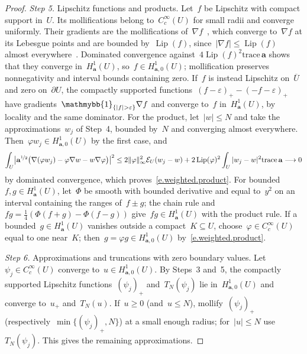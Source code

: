 \documentclass[11pt,letterpaper]{article}
\numberwithin{equation}{section}
\theoremstyle{definition}
\renewcommand{\a}{\mathbf{a}}
\newcommand{\eps}{\varepsilon}
\newcommand{\nf}{\nicefrac}
\newcommand*{\tr}{\mathrm{trace\,}}
\DeclarePairedDelimiter{\norm}{\lVert}{\rVert}
\renewcommand{\subset}{\subseteq}
\newcommand{\indc}{{\mathmybb{1}}}
\newcommand{\Ener}{\mathcal E}
\newcommand{\Hzero}[1]{H^1_{#1,0}}
\begin{document}
\begin{proof}
\smallskip

\emph{Step 5.} Lipschitz functions and products. Let~$f$ be Lipschitz with compact support in~$U$. Its mollifications belong to~$C^\infty_c(U)$ for small radii and converge uniformly. Their gradients are the mollifications of~$\nabla f$~\cite[Lemma 1.18 and Theorem 1.19]{Kinnunen.sobolev}, which converge to~$\nabla f$ at its Lebesgue points and are bounded by~$\operatorname{Lip}(f)$, since~$|\nabla f|\leq\operatorname{Lip}(f)$ almost everywhere~\cite[Theorem 3.31]{Kinnunen.sobolev}. Dominated convergence against~$4\operatorname{Lip}(f)^2\tr\a$ shows that they converge in~$H^1_\a(U)$, so~$f\in\Hzero{\a}(U)$; mollification preserves nonnegativity and interval bounds containing zero. If~$f$ is instead Lipschitz on~$\overline U$ and zero on~$\partial U$, the compactly supported functions~$(f-\eps)_+-(-f-\eps)_+$ have gradients~$\indc_{\{|f|>\eps\}}\nabla f$ and converge to~$f$ in~$H^1_\a(U)$, by locality and the same dominator. For the product, let~$|w|\leq N$ and take the approximations~$w_j$ of Step~4, bounded by~$N$ and converging almost everywhere. Then~$\varphi w_j\in\Hzero{\a}(U)$ by the first case, and
\begin{equation*}
	\int_U\bigl|\a^{\nf12}\bigl(\nabla(\varphi w_j)-\varphi\nabla w-w\nabla\varphi\bigr)\bigr|^2\leq2\norm{\varphi}_\infty^2\Ener_U(w_j-w)+2\operatorname{Lip}(\varphi)^2\int_U|w_j-w|^2\tr\a\longrightarrow0
\end{equation*}
by dominated convergence, which proves~\eqref{e.weighted.product}. For bounded~$f,g\in H^1_\a(U)$, let~$\Phi$ be smooth with bounded derivative and equal to~$y^2$ on an interval containing the ranges of~$f\pm g$; the chain rule and~$fg=\frac14(\Phi(f+g)-\Phi(f-g))$ give~$fg\in H^1_\a(U)$ with the product rule. If a bounded~$g\in H^1_\a(U)$ vanishes outside a compact~$K\subset U$, choose~$\varphi\in C^\infty_c(U)$ equal to one near~$K$; then~$g=\varphi g\in\Hzero{\a}(U)$ by~\eqref{e.weighted.product}.

\smallskip

\emph{Step 6.} Approximations and truncations with zero boundary values. Let~$\psi_j\in C^\infty_c(U)$ converge to~$u\in\Hzero{\a}(U)$. By Steps~3 and~5, the compactly supported Lipschitz functions~$(\psi_j)_+$ and~$T_N(\psi_j)$ lie in~$\Hzero{\a}(U)$ and converge to~$u_+$ and~$T_N(u)$. If~$u\geq0$ (and~$u\leq N$), mollify~$(\psi_j)_+$ (respectively~$\min\{(\psi_j)_+,N\}$) at a small enough radius; for~$|u|\leq N$ use~$T_N(\psi_j)$. This gives the remaining approximations.
\end{proof}
\end{document}
